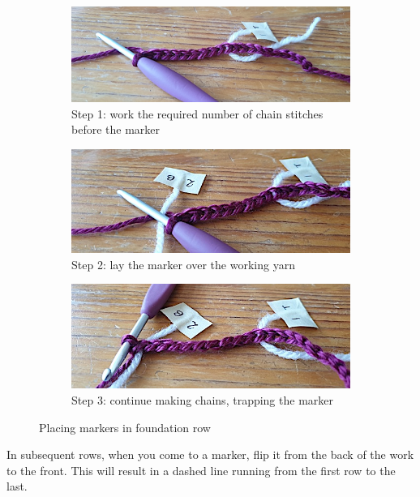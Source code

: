 \documentclass[openany]{book}
\begin{document}
\begin{figure}[H]\centering
\begin{subfigure}[t]{.9\textwidth}
\includegraphics[width=\textwidth]{pic/Ch1}
\caption{Step 1: work the required number of chain stitches before the marker}
\end{subfigure}

\begin{subfigure}[t]{.9\textwidth}
\includegraphics[width=\textwidth]{pic/Ch2}
\caption{Step 2: lay the marker over the working yarn}
\end{subfigure}

\begin{subfigure}[t]{.9\textwidth}
\includegraphics[width=\textwidth]{pic/Ch3}
\caption{Step 3: continue making chains, trapping the marker}
\end{subfigure}
\caption{Placing markers in foundation row}
\end{figure}

In subsequent rows, when you come to a marker, flip it from the back of the work to the front. This will result in a dashed line running from the first row to the last.
\end{document}
